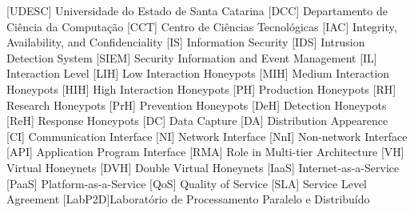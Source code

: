 
%
%

%

\begin{acronym}%
  [UDESC] {Universidade do Estado de Santa Catarina}
    [DCC]   {Departamento de Ci\^{e}ncia da Computa\c{c}\~{a}o}
    [CCT]   {Centro de Ci\^{e}ncias Tecnol\'{o}gicas}
    [IAC]   {Integrity, Availability, and Confidenciality}
     [IS]    {Information Security}
    [IDS]   {Intrusion Detection System}
   [SIEM]  {Security Information and Event Management}
     [IL]    {Interaction Level}
    [LIH]   {Low Interaction Honeypots}
    [MIH]   {Medium Interaction Honeypots}
    [HIH]   {High Interaction Honeypots}
     [PH]    {Production Honeypots}
     [RH]    {Research Honeypots}
    [PrH]   {Prevention Honeypots}
    [DeH]   {Detection Honeypots}
    [ReH]   {Response Honeypots}
     [DC]    {Data Capture}
     [DA]    {Distribution Appearence}
     [CI]    {Communication Interface}
     [NI]    {Network Interface}
    [NnI]   {Non-network Interface}
    [API]   {Application Program Interface}
    [RMA]   {Role in Multi-tier Architecture}
     [VH]    {Virtual Honeynets}
    [DVH]   {Double Virtual Honeynets}
   [IaaS]  {Internet-as-a-Service}
   [PaaS]  {Platform-as-a-Service}
    [QoS]   {Quality of Service}
    [SLA]   {Service Level Agreement}
 [LabP2D]{Laborat\'orio de Processamento Paralelo e Distribu\'ido}

\end{acronym}%
